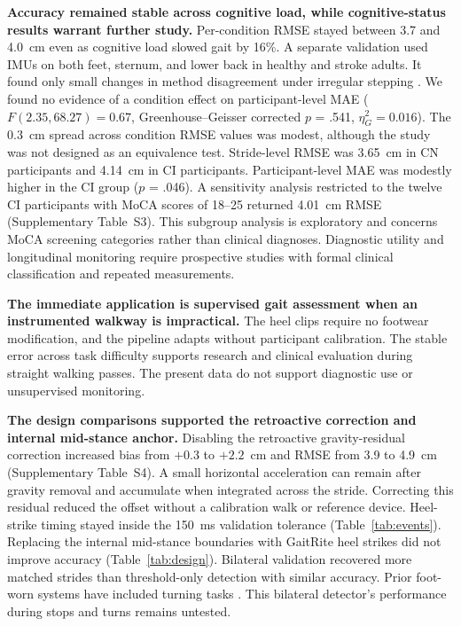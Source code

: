 \documentclass[11pt]{article}
\begin{document}
\textbf{Accuracy remained stable across cognitive load, while cognitive-status results warrant further study.} Per-condition RMSE stayed between 3.7 and 4.0~cm even as cognitive load slowed gait by 16\%. A separate validation used IMUs on both feet, sternum, and lower back in healthy and stroke adults. It found only small changes in method disagreement under irregular stepping \citep{Ensink2023}. We found no evidence of a condition effect on participant-level MAE ($F(2.35, 68.27) = 0.67$, Greenhouse--Geisser corrected $p$ = .541, $\eta^2_G = 0.016$). The 0.3~cm spread across condition RMSE values was modest, although the study was not designed as an equivalence test. Stride-level RMSE was 3.65~cm in CN participants and 4.14~cm in CI participants. Participant-level MAE was modestly higher in the CI group ($p$ = .046). A sensitivity analysis restricted to the twelve CI participants with MoCA scores of 18--25 returned 4.01~cm RMSE (Supplementary Table~S3). This subgroup analysis is exploratory and concerns MoCA screening categories rather than clinical diagnoses. Diagnostic utility and longitudinal monitoring require prospective studies with formal clinical classification and repeated measurements.

\textbf{The immediate application is supervised gait assessment when an instrumented walkway is impractical.} The heel clips require no footwear modification, and the pipeline adapts without participant calibration. The stable error across task difficulty supports research and clinical evaluation during straight walking passes. The present data do not support diagnostic use or unsupervised monitoring.

\textbf{The design comparisons supported the retroactive correction and internal mid-stance anchor.} Disabling the retroactive gravity-residual correction increased bias from $+0.3$ to $+2.2$~cm and RMSE from 3.9 to 4.9~cm (Supplementary Table~S4). A small horizontal acceleration can remain after gravity removal and accumulate when integrated across the stride. Correcting this residual reduced the offset without a calibration walk or reference device. Heel-strike timing stayed inside the 150~ms validation tolerance (Table~\ref{tab:events}). Replacing the internal mid-stance boundaries with GaitRite heel strikes did not improve accuracy (Table~\ref{tab:design}). Bilateral validation recovered more matched strides than threshold-only detection with similar accuracy. Prior foot-worn systems have included turning tasks \citep{Mariani2010}. This bilateral detector's performance during stops and turns remains untested.
\end{document}
